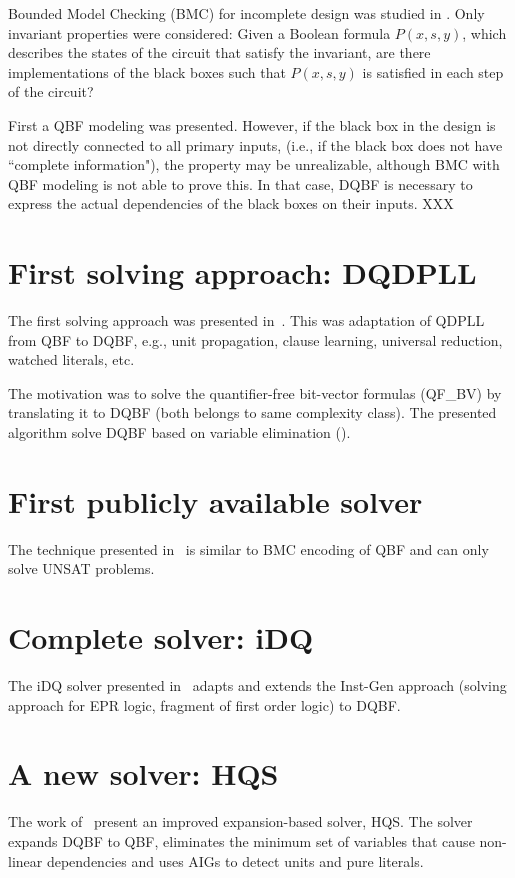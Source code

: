 \documentclass[runningheads]{llncs}
\begin{document}
Bounded Model Checking (BMC) for incomplete design was studied in \cite{millerklb10, millersb13}. Only invariant
properties were considered: Given a Boolean formula $P(x, s, y)$, which describes the states of the circuit that satisfy the invariant, are there implementations of the black boxes such that $P(x, s, y)$ is satisfied in each step of the circuit?

First a QBF modeling was presented. However, if the black box in the design is not directly connected to all primary inputs, (i.e., if the black box does not have ``complete information"), the property may be unrealizable, although BMC with QBF modeling is not able to prove this.
In that case, DQBF is necessary to express the actual dependencies of the black boxes on their inputs.
XXX

\section{First solving approach: DQDPLL}
The first solving approach was presented in~\cite{frohlich2012dpll}.
%
This was adaptation of QDPLL from QBF to DQBF, e.g., unit propagation, clause
learning, universal reduction, watched literals, etc.
%

The motivation was to solve the quantifier-free bit-vector formulas (QF\_BV) by translating it to DQBF (both belongs to same complexity class).
%
The presented algorithm solve DQBF based on variable elimination (\cite{biere2004resolve}).

\section{First publicly available solver}
The technique presented in~\cite{finkbeiner2014fast} is similar to BMC encoding of QBF and can only solve UNSAT problems.

\section{Complete solver: iDQ}
The iDQ solver presented in~\cite{frohlich2014idq} adapts and extends the Inst-Gen approach (solving approach for EPR logic, fragment of first order logic) to DQBF.

\section{A new solver: HQS}
The work of~\cite{gitina2015solving} present an improved expansion-based solver, HQS.
%
The solver expands DQBF to QBF, eliminates the minimum set of variables that cause non-linear
dependencies and uses AIGs to detect units and pure literals.
\end{document}
